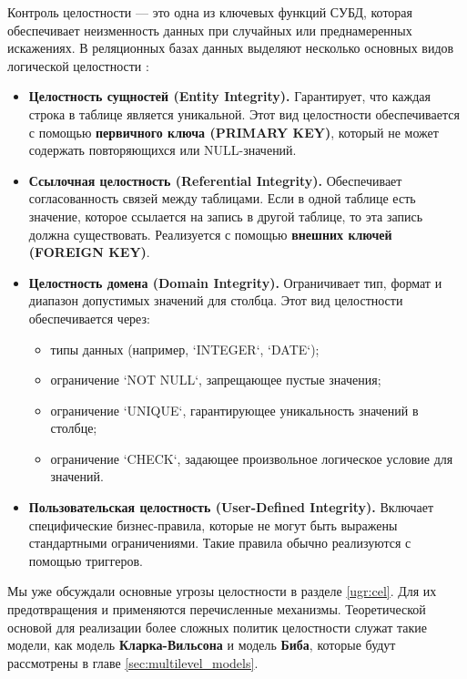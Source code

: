 Контроль целостности — это одна из ключевых функций СУБД, которая обеспечивает неизменность данных при случайных или преднамеренных искажениях. В реляционных базах данных выделяют несколько основных видов логической целостности \autocite{Silberschatz}:

\begin{itemize}
    \item \textbf{Целостность сущностей (Entity Integrity).} Гарантирует, что каждая строка в таблице является уникальной. Этот вид целостности обеспечивается с помощью \textbf{первичного ключа (PRIMARY KEY)}, который не может содержать повторяющихся или NULL-значений.
    
    \item \textbf{Ссылочная целостность (Referential Integrity).} Обеспечивает согласованность связей между таблицами. Если в одной таблице есть значение, которое ссылается на запись в другой таблице, то эта запись должна существовать. Реализуется с помощью \textbf{внешних ключей (FOREIGN KEY)}.
    
    \item \textbf{Целостность домена (Domain Integrity).} Ограничивает тип, формат и диапазон допустимых значений для столбца. Этот вид целостности обеспечивается через:
    \begin{itemize}
        \item типы данных (например, `INTEGER`, `DATE`);
        \item ограничение `NOT NULL`, запрещающее пустые значения;
        \item ограничение `UNIQUE`, гарантирующее уникальность значений в столбце;
        \item ограничение `CHECK`, задающее произвольное логическое условие для значений.
    \end{itemize}
    
    \item \textbf{Пользовательская целостность (User-Defined Integrity).} Включает специфические бизнес-правила, которые не могут быть выражены стандартными ограничениями. Такие правила обычно реализуются с помощью триггеров.
\end{itemize}

Мы уже обсуждали основные угрозы целостности в разделе \ref{ugr:cel}. Для их предотвращения и применяются перечисленные механизмы. Теоретической основой для реализации более сложных политик целостности служат такие модели, как модель \textbf{Кларка-Вильсона} и модель \textbf{Биба}, которые будут рассмотрены в главе \ref{sec:multilevel_models}.

